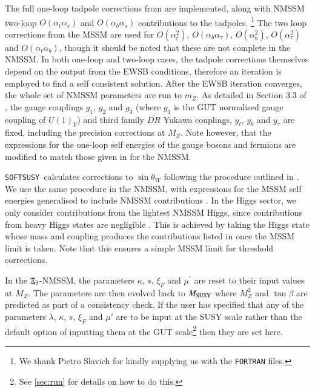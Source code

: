 \documentclass[final,3p,times,pdflatex]{elsarticle}
\def\SOFTSUSY{{\tt SOFTSUSY}}
\newcommand{\Zv}{\,\mathbf{\backslash}\mkern-11.0mu{\mathbb{Z}}_{3}} %
\def\at{\alpha_t}
\def\ab{\alpha_b}
\def\as{\alpha_s}
\def\atau{\alpha_{\tau}}
\def\oatab{O(\at\ab)}
\def\oatas{O(\at\as)}
\def\oabas{O(\ab\as)}
\def\oatq{O(\at^2)}
\def\oabq{O(\ab^2)}
\def\oatauq{O(\atau^2)}
\def\oabatau{O(\ab \atau)}
\begin{document}
The full one-loop tadpole corrections
 from \cite{Degrassi:2009yq} are implemented, along with NMSSM two-loop 
$\oatas$ and $\oabas$ contributions \cite{Degrassi:2009yq} to the tadpoles.%
\footnote{We thank Pietro Slavich for kindly supplying us with the {\tt FORTRAN}
 files.}
 The two loop corrections from the MSSM are used for $\oatq$, $\oabatau$, 
$\oabq$, $\oatauq$ and $\oatab$, though it should be noted that these are not
complete in the NMSSM.  In both one-loop and two-loop cases, the tadpole 
corrections themselves depend on the output from the EWSB conditions, therefore 
an iteration is employed to find a self consistent solution.
After the EWSB iteration converges, the whole set of NMSSM parameters are run to
 $m_Z$. As detailed in Section 3.3 of \cite{Allanach:2001kg}, the gauge 
couplings $g_1$, $g_2$ and $g_3$ (where $g_1$ is the GUT normalised gauge 
coupling of $U(1)_Y$) and third family $\overline{DR}$ Yukawa couplings, $y_t$, 
$y_b$ and $y_\tau$ are fixed, including the precision corrections at $M_Z$.  Note
 however, that the expressions for the one-loop self energies of the gauge 
bosons and fermions are modified to match those given in \cite{Degrassi:2009yq}
 for the NMSSM.

\SOFTSUSY~calculates corrections to $\sin \theta_W$ following the procedure outlined 
in \cite{Pierce:1997zz}.  We use the same procedure in the NMSSM, with expressions 
for the MSSM self energies \cite{Pierce:1997zz} generalised to include NMSSM contributions 
\cite{Degrassi:2009yq}.  In the Higgs sector, we only consider contributions from the 
lightest NMSSM Higgs, since contributions from heavy Higgs states are negligible 
\cite{Pierce:1997zz}.  This is achieved by taking the Higgs state whose mass and coupling 
produces the contributions listed in \cite{Pierce:1997zz} once the MSSM limit is taken.  
Note that this ensures a simple MSSM limit for threshold corrections. 

In the $\Zv$-NMSSM, the parameters $\kappa$, $s$, $\xi_F$ and $\mu^\prime$ are 
reset to their input values at $M_Z$.  The parameters are then evolved back to 
$M_{\rm SUSY}$ where $M_Z^2$ and $\tan\beta$ are predicted as part of a consistency 
check.  If the user has specified that any of the parameters $\lambda$, $\kappa$, $s$, 
$\xi_F$ and $\mu'$  are to be input at the SUSY scale rather than the default option of 
inputting them at the GUT scale\footnote{See \ref{sec:run} for details on how to do this.} 
then they are set here.  
\end{document}
